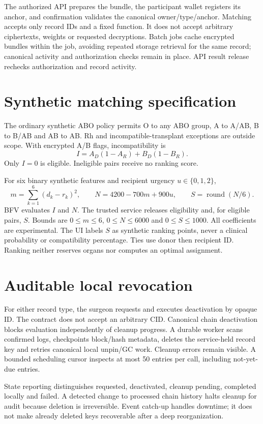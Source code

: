 \documentclass[11pt,a4paper]{article}
\begin{document}
The authorized API prepares the bundle, the participant wallet registers its anchor, and confirmation validates the canonical owner/type/anchor. Matching accepts only record IDs and a fixed function. It does not accept arbitrary ciphertexts, weights or requested decryptions. Batch jobs cache encrypted bundles within the job, avoiding repeated storage retrieval for the same record; canonical activity and authorization checks remain in place. API result release rechecks authorization and record activity.

\section{Synthetic matching specification}
The ordinary synthetic ABO policy permits O to any ABO group, A to A/AB, B to B/AB and AB to AB. Rh and incompatible-transplant exceptions are outside scope. With encrypted A/B flags, incompatibility is
\[
I=A_D(1-A_R)+B_D(1-B_R).
\]
Only $I=0$ is eligible. Ineligible pairs receive no ranking score.

For six binary synthetic features and recipient urgency $u\in\{0,1,2\}$,
\[
m=\sum_{k=1}^{6}(d_k-r_k)^2,\qquad
N=4200-700m+900u,\qquad
S=\operatorname{round}(N/6).
\]
BFV evaluates $I$ and $N$. The trusted service releases eligibility and, for eligible pairs, $S$. Bounds are $0\le m\le6$, $0\le N\le6000$ and $0\le S\le1000$. All coefficients are experimental. The UI labels $S$ as synthetic ranking points, never a clinical probability or compatibility percentage. Ties use donor then recipient ID. Ranking neither reserves organs nor computes an optimal assignment.

\section{Auditable local revocation}
For either record type, the surgeon requests and executes deactivation by opaque ID. The contract does not accept an arbitrary CID. Canonical chain deactivation blocks evaluation independently of cleanup progress. A durable worker scans confirmed logs, checkpoints block/hash metadata, deletes the service-held record key and retries canonical local unpin/GC work. Cleanup errors remain visible. A bounded scheduling cursor inspects at most 50 entries per call, including not-yet-due entries.

State reporting distinguishes requested, deactivated, cleanup pending, completed locally and failed. A detected change to processed chain history halts cleanup for audit because deletion is irreversible. Event catch-up handles downtime; it does not make already deleted keys recoverable after a deep reorganization.
\end{document}
